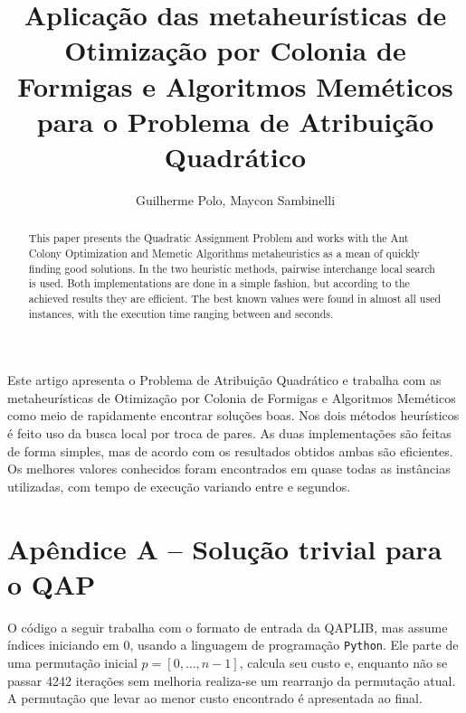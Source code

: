 \documentclass[a4paper, 12pt]{article}
\title{Aplicação das metaheurísticas de Otimização por Colonia
de Formigas e Algoritmos Meméticos para o Problema de Atribuição Quadrático}
\author{Guilherme Polo\inst{1}, Maycon Sambinelli\inst{1}}
\begin{document}
\maketitle

\begin{abstract}
  This paper presents the Quadratic Assignment Problem and works with
  the Ant Colony Optimization and Memetic Algorithms metaheuristics as
  a mean of quickly finding good solutions. In the two heuristic methods,
  pairwise interchange local search is used. Both implementations are
  done in a simple fashion, but according to the achieved results they
  are efficient. The best known values were found in almost all used
  instances, with the execution time ranging between 
  and  seconds.
\end{abstract}

\begin{resumo}
  Este artigo apresenta o Problema de Atribuição Quadrático e
  trabalha com as metaheurísticas de Otimização por Colonia de
  Formigas e Algoritmos Meméticos como meio de rapidamente encontrar
  soluções boas. Nos dois métodos heurísticos é feito uso da
  busca local por troca de pares. As duas implementações são feitas de
  forma simples, mas de acordo com os resultados obtidos ambas são
  eficientes. Os melhores valores conhecidos foram encontrados em
  quase todas as instâncias utilizadas, com tempo de execução variando
  entre  e  segundos.
\end{resumo}






\section*{Apêndice A -- Solução trivial para o QAP}
\label{apendiceA}

O código a seguir trabalha com o formato de entrada da QAPLIB, mas
assume índices iniciando em 0, usando a linguagem de programação
\texttt{Python}. Ele parte de uma permutação inicial $p = [0, \ldots,
n - 1]$, calcula seu custo e, enquanto não se passar 4242 iterações
sem melhoria realiza-se um rearranjo da permutação atual. A permutação
que levar ao menor custo encontrado é apresentada ao final.
\end{document}
